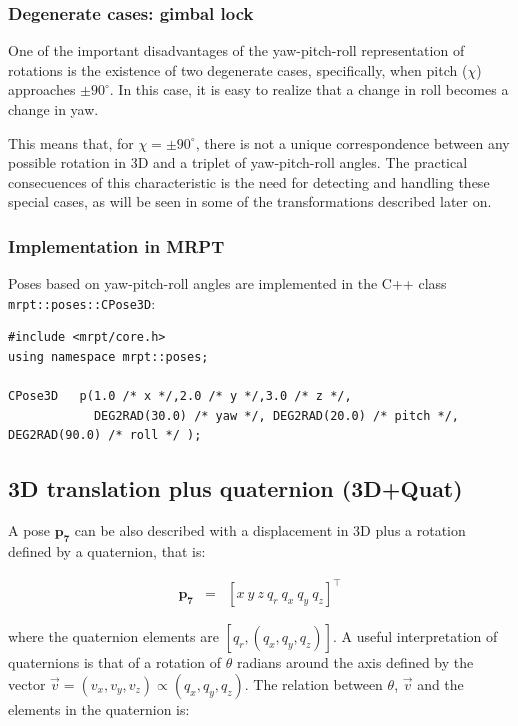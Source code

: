 \documentclass[a4paper,10pt]{report}
\begin{document}
\subsubsection{Degenerate cases: gimbal lock}
\label{sect:ypr:gimbal}

One of the important disadvantages of the yaw-pitch-roll representation of rotations is the existence 
of two degenerate cases, specifically, when pitch ($\chi$) approaches $\pm 90^\circ$. In this case, 
it is easy to realize that a change in roll becomes a change in yaw.

This means that, for $ \chi = \pm 90^\circ$, there is not a unique correspondence between any possible
rotation in 3D and a triplet of yaw-pitch-roll angles. 
The practical consecuences of this characteristic is the need for detecting and handling these 
special cases, as will be seen in some of the transformations described later on.


\subsubsection{Implementation in MRPT}

Poses based on yaw-pitch-roll angles are implemented in the C++ class \texttt{mrpt::poses::CPose3D}:

\begin{lstlisting}
#include <mrpt/core.h> 
using namespace mrpt::poses; 

CPose3D   p(1.0 /* x */,2.0 /* y */,3.0 /* z */, 
            DEG2RAD(30.0) /* yaw */, DEG2RAD(20.0) /* pitch */, DEG2RAD(90.0) /* roll */ );
\end{lstlisting}


\newpage

\subsection{3D translation plus quaternion (3D+Quat)}

A pose $\mathbf{p_7}$ can be also described with a displacement in 3D plus a rotation 
defined by a quaternion, that is:

\begin{eqnarray}
\mathbf{p_7} &=& [x ~ y ~ z ~  q_r ~ q_x ~ q_y ~ q_z ] ^ \top
\end{eqnarray}

\noindent where the quaternion elements are $[q_r, (q_x,q_y,q_z)]$. A useful interpretation of quaternions
is that of a rotation of $\theta$ radians around the axis defined by the vector $\vec{v} = (v_x,v_y,v_z) \propto (q_x,q_y,q_z)$.
The relation between $\theta$, $\vec{v}$ and the elements in the quaternion is:
\end{document}
